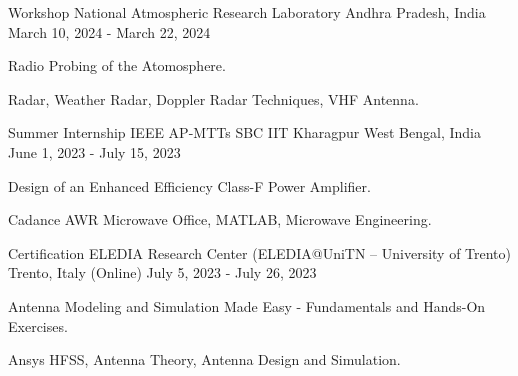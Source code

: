 

\begin{cventries}

  \cventry
    {Workshop} %
    {National Atmospheric Research Laboratory} %
    {Andhra Pradesh, India} %
    {March 10, 2024 - March 22, 2024} %
    {
      \begin{cvitems} %
        \item {Radio Probing of the Atomosphere.}
        \item { Radar, Weather Radar, Doppler Radar Techniques, VHF Antenna.}
      \end{cvitems}
    }


  \cventry
    {Summer Internship} %
    {IEEE AP-MTTs SBC IIT Kharagpur} %
    {West Bengal, India} %
    {June 1, 2023 - July 15, 2023} %
    {
      \begin{cvitems} %
        \item {Design of an Enhanced Efficiency Class-F Power Amplifier.}
        \item { Cadance AWR Microwave Office, MATLAB, Microwave Engineering.}
      \end{cvitems}
    }


\cventry
{Certification} %
{ELEDIA Research Center (ELEDIA@UniTN – University of Trento)} %
{Trento, Italy (Online)} %
{July 5, 2023 - July 26, 2023} %
{
	\begin{cvitems} %
		\item {Antenna Modeling and Simulation Made Easy - Fundamentals and Hands-On Exercises.}
		\item { Ansys HFSS, Antenna Theory, Antenna Design and Simulation.}
	\end{cvitems}
}

\end{cventries}
